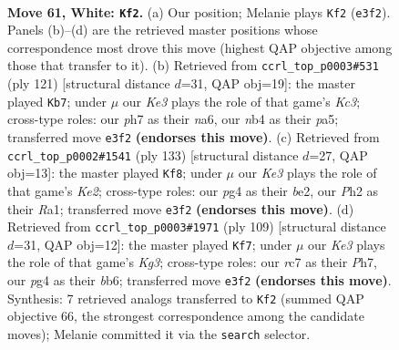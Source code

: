 \documentclass[11pt]{article}
\begin{document}
\clearpage

\begin{figure}[p]\centering
\begin{subfigure}{0.46\textwidth}\centering
\resizebox{\linewidth}{!}{%
\newchessgame
\chessboard[
  setfen={8/2r1kp1p/6p1/4P3/bn3Pp1/4K3/3N3P/1B6 w - - 12 61},
  showmover=false,
  pgfstyle=straightmove, color=movearrow, markmove={e3-f2}
]}
\caption{}
\end{subfigure}\hfill
\begin{subfigure}{0.46\textwidth}\centering
\resizebox{\linewidth}{!}{%
\newchessgame
\chessboard[
  setfen={5b2/3n4/N1k5/Pp2p3/1P2P1p1/8/3BK1P1/8 b - - 2 61},
  showmover=false,
  pgfstyle=straightmove, color=movearrow, markmove={c6-b7}
]}
\caption{}
\end{subfigure}
\\[4pt]
\begin{subfigure}{0.46\textwidth}\centering
\resizebox{\linewidth}{!}{%
\newchessgame
\chessboard[
  setfen={8/4kb2/5p1p/5P1P/1R2K1P1/8/4B3/r7 b - - 4 67},
  showmover=false,
  pgfstyle=straightmove, color=movearrow, markmove={e7-f8}
]}
\caption{}
\end{subfigure}\hfill
\begin{subfigure}{0.46\textwidth}\centering
\resizebox{\linewidth}{!}{%
\newchessgame
\chessboard[
  setfen={8/7p/pB4k1/3p2p1/6P1/P1P2P2/6K1/3b4 b - - 9 55},
  showmover=false,
  pgfstyle=straightmove, color=movearrow, markmove={g6-f7}
]}
\caption{}
\end{subfigure}
\caption{\textbf{Move 61, White: \texttt{Kf2}.} (a) Our position; Melanie plays \texttt{Kf2} (\texttt{e3f2}). Panels (b)--(d) are the retrieved master positions whose correspondence most drove this move (highest QAP objective among those that transfer to it). (b) Retrieved from \texttt{ccrl\_top\_p0003\#531} (ply 121) [structural distance $d$=31, QAP obj=19]: the master played \texttt{Kb7}; under $\mu$ our \emph{Ke3} plays the role of that game's \emph{Kc3}; cross-type roles: our \emph{p}h7 as their \emph{n}a6, our \emph{n}b4 as their \emph{p}a5; transferred move \texttt{e3f2} \textbf{(endorses this move)}. (c) Retrieved from \texttt{ccrl\_top\_p0002\#1541} (ply 133) [structural distance $d$=27, QAP obj=13]: the master played \texttt{Kf8}; under $\mu$ our \emph{Ke3} plays the role of that game's \emph{Ke2}; cross-type roles: our \emph{p}g4 as their \emph{b}e2, our \emph{P}h2 as their \emph{R}a1; transferred move \texttt{e3f2} \textbf{(endorses this move)}. (d) Retrieved from \texttt{ccrl\_top\_p0003\#1971} (ply 109) [structural distance $d$=31, QAP obj=12]: the master played \texttt{Kf7}; under $\mu$ our \emph{Ke3} plays the role of that game's \emph{Kg3}; cross-type roles: our \emph{r}c7 as their \emph{P}h7, our \emph{p}g4 as their \emph{b}b6; transferred move \texttt{e3f2} \textbf{(endorses this move)}. Synthesis: 7 retrieved analogs transferred to \texttt{Kf2} (summed QAP objective 66, the strongest correspondence among the candidate moves); Melanie committed it via the \texttt{search} selector.}
\label{fig:thought-m120}
\end{figure}
\end{document}
